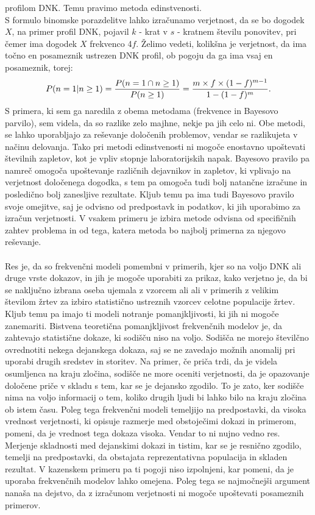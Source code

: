 \documentclass[12pt,a4paper]{amsart}
\theoremstyle{definition} %
\theoremstyle{plain} %
\begin{document}
profilom DNK. Temu pravimo metoda edinstvenosti. \\
S formulo binomske porazdelitve lahko izračunamo verjetnost, da se bo dogodek $X$, na primer profil DNK, pojavil $k$ - krat v $s$ - kratnem
številu ponovitev, pri čemer ima dogodek $X$ frekvenco 4$f$. Želimo vedeti, kolikšna je verjetnost, da ima točno en posameznik ustrezen DNK
profil, ob pogoju da ga ima vsaj en posameznik, torej:
\[
   P(n = 1 \lvert n \ge 1) = \frac{P(n=1 \cap n \ge 1)}{P(n \ge 1)} = \frac{m \times f \times (1 - f)^{m-1}}{1 - (1 - f)^m}. \vspace{2mm}
\]
S primera, ki sem ga naredila z obema metodama (frekvence in Bayesovo parvilo), sem videla, da so razlike zelo majhne, nekje pa jih celo ni.  Obe metodi, 
se lahko uporabljajo za reševanje določenih problemov, vendar se razlikujeta v načinu delovanja. Tako pri metodi edinstvenosti ni mogoče enostavno 
upoštevati številnih zapletov, kot je vpliv stopnje laboratorijskih napak. Bayesovo pravilo pa namreč omogoča upoštevanje različnih dejavnikov in 
zapletov, ki vplivajo na verjetnost določenega dogodka, s tem pa omogoča tudi bolj natančne izračune in posledično bolj zanesljive rezultate. Kljub 
temu pa ima tudi Bayesovo pravilo svoje omejitve, saj je odvisno od predpostavk in podatkov, ki jih uporabimo za izračun verjetnosti. V vsakem primeru je 
izbira metode odvisna od specifičnih zahtev problema in od tega, katera metoda bo najbolj primerna za njegovo reševanje.\\\\
Res je, da so frekvenčni modeli pomembni v primerih, kjer so na voljo DNK ali druge vrste dokazov, in jih je mogoče uporabiti za prikaz, kako verjetno je, 
da bi se naključno izbrana oseba ujemala z vzorcem ali ali v primerih z velikim številom žrtev za izbiro statistično ustreznih vzorcev celotne populacije 
žrtev. Kljub temu pa imajo ti modeli notranje pomanjkljivosti, ki jih ni mogoče zanemariti. Bistvena teoretična pomanjkljivost frekvenčnih modelov je, 
da zahtevajo statistične dokaze, ki sodišču niso na voljo. Sodišča ne morejo številčno ovrednotiti nekega dejanskega dokaza, saj se ne zavedajo možnih 
anomalij pri uporabi drugih sredstev in storitev. Na primer, če priča trdi, da je videla osumljenca na kraju zločina, sodišče ne more oceniti verjetnosti, 
da je opazovanje določene priče v skladu s tem, kar se je dejansko zgodilo. To je zato, ker sodišče nima na voljo informacij o tem, koliko drugih ljudi 
bi lahko bilo na kraju zločina ob istem času. Poleg tega frekvenčni modeli temeljijo na predpostavki, da visoka vrednost verjetnosti, ki opisuje razmerje 
med obstoječimi dokazi in primerom, pomeni, da je vrednost tega dokaza visoka. Vendar to ni nujno vedno res. Merjenje skladnosti med dejanskimi dokazi 
in tistim, kar se je resnično zgodilo, temelji na predpostavki, da obstajata reprezentativna populacija in skladen rezultat. V kazenskem primeru pa 
ti pogoji niso izpolnjeni, kar pomeni, da je uporaba frekvenčnih modelov lahko omejena. Poleg tega se najmočnejši argument nanaša na dejstvo, da z 
izračunom verjetnosti ni mogoče upoštevati posameznih primerov.
\end{document}
